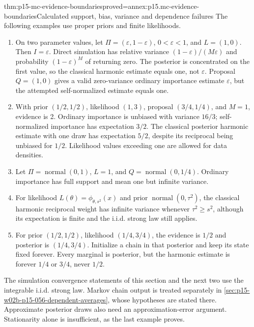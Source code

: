 \begin{hbtheorem}{thm:p15-mc-evidence-boundaries}{proved=annex:p15.mc-evidence-boundaries}{Calculated support, bias, variance and dependence failures}
The following examples use proper priors and finite likelihoods.
\begin{enumerate}
\item On two parameter values, let \(\Pi=(\varepsilon,1-\varepsilon)\),
\(0<\varepsilon<1\), and \(L=(1,0)\). Then \(I=\varepsilon\).
Direct simulation has relative variance
\((1-\varepsilon)/(M\varepsilon)\) and probability
\((1-\varepsilon)^M\) of returning zero. The posterior is concentrated
on the first value, so the classical harmonic estimate equals one,
not \(\varepsilon\). Proposal \(Q=(1,0)\) gives a valid zero-variance
ordinary importance estimate \(\varepsilon\), but the attempted
self-normalized estimate equals one.
\item With prior \((1/2,1/2)\), likelihood \((1,3)\), proposal
\((3/4,1/4)\), and \(M=1\), evidence is 2. Ordinary importance is
unbiased with variance \(16/3\); self-normalized importance has expectation
\(3/2\). The classical posterior harmonic estimate with one draw has
expectation \(5/2\), despite its reciprocal being unbiased for \(1/2\).
Likelihood values exceeding one are allowed for data densities.
\item Let \(\Pi=\operatorname{normal}(0,1)\), \(L=1\), and
\(Q=\operatorname{normal}(0,1/4)\). Ordinary importance has full support
and mean one but infinite variance.
\item For likelihood \(L(\theta)=\phi_{\theta,s^2}(x)\) and prior
\(\operatorname{normal}(0,\tau^2)\), the classical harmonic reciprocal
weight has infinite variance whenever \(\tau^2\geq s^2\), although
its expectation is finite and the i.i.d. strong law still applies.
\item For prior \((1/2,1/2)\), likelihood \((1/4,3/4)\), the evidence
is \(1/2\) and posterior is \((1/4,3/4)\). Initialize a chain in that
posterior and keep its state fixed forever. Every marginal is posterior,
but the harmonic estimate is forever \(1/4\) or \(3/4\), never \(1/2\).
\end{enumerate}
\end{hbtheorem}

The simulation convergence statements of this section and the next two use
the integrable i.i.d. strong law. Markov chain output is treated separately
in \cref{sec:p15-w02b-p15-056-dependent-averages}, whose hypotheses are
stated there. Approximate posterior draws also need an approximation-error
argument. Stationarity alone is insufficient, as the last example proves.

